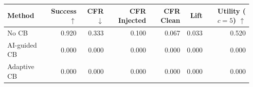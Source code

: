 \begin{tabular}{lrrrrrr}
\toprule
Method & Success $\uparrow$ & CFR $\downarrow$ & CFR Injected & CFR Clean & Lift & Utility ($c=5$) $\uparrow$ \\
\midrule
No CB & 0.920 & 0.333 & 0.100 & 0.067 & 0.033 & 0.520 \\
AI-guided CB & 0.000 & 0.000 & 0.000 & 0.000 & 0.000 & 0.000 \\
Adaptive CB & 0.000 & 0.000 & 0.000 & 0.000 & 0.000 & 0.000 \\
\bottomrule
\end{tabular}
